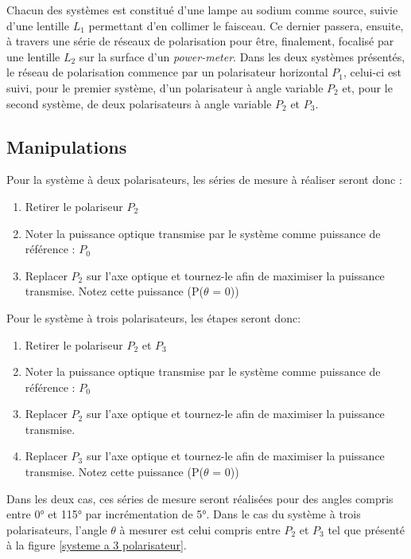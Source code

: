 \documentclass[11pt,letterpaper]{article}
\begin{document}
Chacun des systèmes est constitué d'une lampe au sodium comme source, suivie d'une lentille $L_1$ permettant d'en collimer le faisceau. Ce dernier passera, ensuite, à travers une série de réseaux de polarisation pour être, finalement, focalisé par une lentille $L_2$ sur la surface d'un \textit{power-meter}. Dans les deux systèmes présentés, le réseau de polarisation commence par un polarisateur horizontal $P_1$, celui-ci est suivi, pour le premier système, d'un polarisateur à angle variable $P_2$  et, pour le second système, de deux polarisateurs à angle variable $P_2$ et $P_3$.

\subsection{Manipulations}

Pour la système à deux polarisateurs, les séries de mesure à réaliser seront donc :

\begin{enumerate}
    \item Retirer le polariseur $P_2$
    \item Noter la puissance optique transmise par le système comme puissance de référence : $P_0$
    \item Replacer $P_2$ sur l’axe optique et tournez-le afin de maximiser la puissance transmise. Notez cette puissance (P($\theta$ = 0))
\end{enumerate}

Pour le système à trois polarisateurs, les étapes seront donc: 

\begin{enumerate}
    \item Retirer le polariseur $P_2$ et $P_3$
    \item Noter la puissance optique transmise par le système comme puissance de référence : $P_0$
    \item Replacer $P_2$ sur l’axe optique et tournez-le afin de maximiser la puissance transmise.
    \item Replacer $P_3$ sur l’axe optique et tournez-le afin de maximiser la puissance transmise. Notez cette puissance (P($\theta$ = 0))
\end{enumerate}

Dans les deux cas, ces séries de mesure seront réalisées pour des angles compris entre 0° et 115° par incrémentation de 5°. Dans le cas du système à trois polarisateurs, l'angle $\theta$ à mesurer est celui compris entre $P_2$ et $P_3$ tel que présenté à la figure \ref{systeme a 3 polarisateur}.
\end{document}
